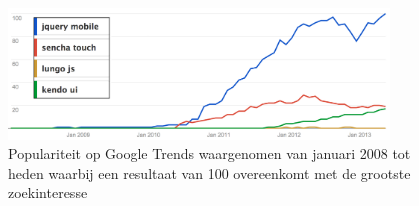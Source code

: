 \begin{figure}[H]
  \centering
  \includegraphics[width=0.9\textwidth]{figuren/google-trends.png}
  \caption{Populariteit op Google Trends waargenomen van januari 2008 tot heden waarbij een resultaat van 100 overeenkomt met de grootste zoekinteresse~\cite{Google2012a}}
  \label{fig:google-trends}
\end{figure}